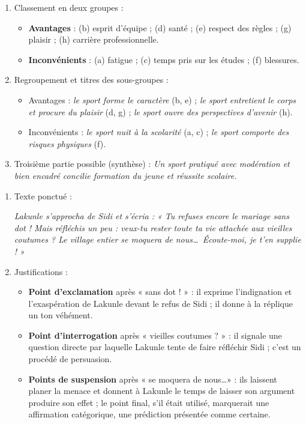 \documentclass[11pt]{article}
\begin{document}
\begin{corrige}
\begin{enumerate}
\item Classement en deux groupes :
\begin{itemize}
\item \textbf{Avantages} : (b) esprit d'équipe ; (d) santé ; (e) respect des règles ; (g) plaisir ; (h) carrière professionnelle.
\item \textbf{Inconvénients} : (a) fatigue ; (c) temps pris sur les études ; (f) blessures.
\end{itemize}
\item Regroupement et titres des sous-groupes :
\begin{itemize}
\item Avantages : \emph{le sport forme le caractère} (b, e) ; \emph{le sport entretient le corps et procure du plaisir} (d, g) ; \emph{le sport ouvre des perspectives d'avenir} (h).
\item Inconvénients : \emph{le sport nuit à la scolarité} (a, c) ; \emph{le sport comporte des risques physiques} (f).
\end{itemize}
\item Troisième partie possible (synthèse) : \emph{Un sport pratiqué avec modération et bien encadré concilie formation du jeune et réussite scolaire.}
\end{enumerate}
\end{corrige}

\begin{corrige}
\begin{enumerate}
\item Texte ponctué :

\emph{Lakunle s'approcha de Sidi et s'écria : « Tu refuses encore le mariage sans dot ! Mais réfléchis un peu : veux-tu rester toute ta vie attachée aux vieilles coutumes ? Le village entier se moquera de nous\ldots\ Écoute-moi, je t'en supplie ! »}
\item Justifications :
\begin{itemize}
\item \textbf{Point d'exclamation} après « sans dot ! » : il exprime l'indignation et l'exaspération de Lakunle devant le refus de Sidi ; il donne à la réplique un ton véhément.
\item \textbf{Point d'interrogation} après « vieilles coutumes ? » : il signale une question directe par laquelle Lakunle tente de faire réfléchir Sidi ; c'est un procédé de persuasion.
\item \textbf{Points de suspension} après « se moquera de nous\ldots » : ils laissent planer la menace et donnent à Lakunle le temps de laisser son argument produire son effet ; le point final, s'il était utilisé, marquerait une affirmation catégorique, une prédiction présentée comme certaine.
\end{itemize}
\end{enumerate}
\end{corrige}
\end{document}

